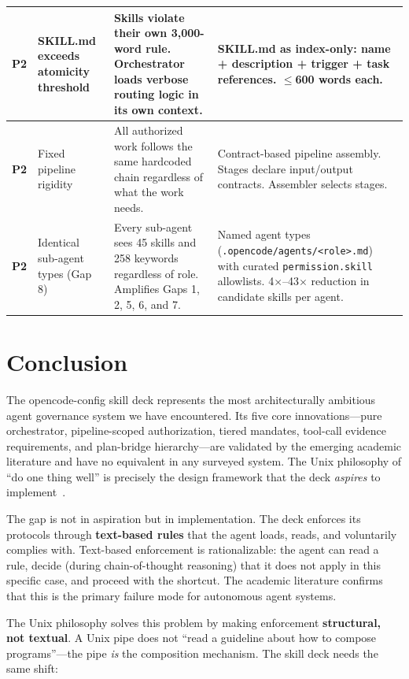 \documentclass[11pt,a4paper]{article}
\begin{document}
\begin{table}[htbp]
\begin{tabular}{@{}clp{4cm}p{5cm}@{}}
\midrule
\textbf{P2} & SKILL.md exceeds atomicity threshold & Skills violate their own 3,000-word rule.  Orchestrator loads verbose routing logic in its own context. & SKILL.md as index-only: name + description + trigger + task references.  $\leq$600 words each. \\
\midrule
\textbf{P2} & Fixed pipeline rigidity & All authorized work follows the same hardcoded chain regardless of what the work needs. & Contract-based pipeline assembly.  Stages declare input/output contracts.  Assembler selects stages. \\
\midrule
\textbf{P2} & Identical sub-agent types (Gap 8) & Every sub-agent sees 45 skills and 258 keywords regardless of role.  Amplifies Gaps 1, 2, 5, 6, and 7. & Named agent types (\texttt{.opencode/agents/<role>.md}) with curated \texttt{permission.skill} allowlists.  4$\times$--43$\times$ reduction in candidate skills per agent. \\
\bottomrule
\end{tabular}
\end{table}

\newpage

\section{Conclusion}

The opencode-config skill deck represents the most architecturally ambitious agent governance system we have encountered.  Its five core innovations---pure orchestrator, pipeline-scoped authorization, tiered mandates, tool-call evidence requirements, and plan-bridge hierarchy---are validated by the emerging academic literature and have no equivalent in any surveyed system.  The Unix philosophy of ``do one thing well'' is precisely the design framework that the deck \emph{aspires} to implement~\cite{piskala2026unix}.

The gap is not in aspiration but in implementation.  The deck enforces its protocols through \textbf{text-based rules} that the agent loads, reads, and voluntarily complies with.  Text-based enforcement is rationalizable: the agent can read a rule, decide (during chain-of-thought reasoning) that it does not apply in this specific case, and proceed with the shortcut.  The academic literature confirms that this is the primary failure mode for autonomous agent systems.

The Unix philosophy solves this problem by making enforcement \textbf{structural, not textual}.  A Unix pipe does not ``read a guideline about how to compose programs''---the pipe \emph{is} the composition mechanism.  The skill deck needs the same shift:
\end{document}
